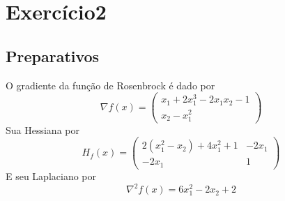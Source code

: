 \documentclass[a4paper, 12pt]{article}
\begin{document}
\section{Exercício2}
\subsection{Preparativos}
O gradiente da função de Rosenbrock é dado por
\begin{equation}
\nabla f(x)=
\begin{pmatrix}
x_1+2x_1^3-2x_1x_2-1\\ 
x_2-x_1^2
\end{pmatrix}
\end{equation}
Sua Hessiana por
\begin{equation}
H_f(x)=
\begin{pmatrix}
2(x_1^2-x_2)+4x_1^2+1& -2x_1\\ 
-2x_1& 1
\end{pmatrix}
\end{equation}
E seu Laplaciano por
\begin{equation}
\nabla^2f(x)=6x_1^2-2x_2+2
\end{equation}
\end{document}
